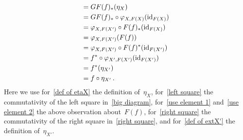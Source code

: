 \begin{remark}[label = triangle equalities]
\begin{enumerate}
\begin{align}
        ={}&  GF(f)_*( \eta_X ) \notag  \\
        ={}&  GF(f)_* \circ \varphi_{X,F(X)}( \operatorname{id}_{F(X)} )  \label{def of etaX} \\
        ={}&  \varphi_{X, F(X')} \circ F(f)_*( \operatorname{id}_{F(X)} ) \label{left square} \\
        ={}&  \varphi_{X, F(X')}(F(f))  \label{use element 1} \\
        ={}&  \varphi_{X, F(X')} \circ F(f)^*( \operatorname{id}_{F(X')} )  \label{use element 2} \\
        ={}&  f^* \circ \varphi_{X', F(X')}( \operatorname{id}_{F(X')} )  \label{right square}  \\
        ={}&  f^* ( \eta_{X'} \label{def of extX'} )  \\
        ={}&  f \circ \eta_{X'} \notag  \,.
      \end{align}
      Here we use for~\eqref{def of etaX} the definition of~$\eta_X$, for~\eqref{left square} the commutativity of the left square in~\eqref{big diagram}, for~\eqref{use element 1} and~\eqref{use element 2} the above observation about~$F(f)$, for~\eqref{right square} the commutativity of the right square in~\eqref{right square}, and for~\eqref{def of extX'} the definition of~$\eta_{X'}$.
      

\end{enumerate}
\end{remark}
